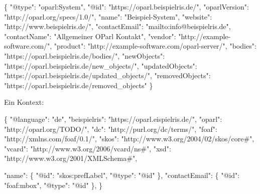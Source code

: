 \documentclass[,a4paper]{article}
\newenvironment{Shaded}{}{}
\newcommand{\DataTypeTok}[1]{\textcolor[rgb]{0.56,0.13,0.00}{{#1}}}
\newcommand{\StringTok}[1]{\textcolor[rgb]{0.25,0.44,0.63}{{#1}}}
\newcommand{\NormalTok}[1]{{#1}}
\begin{document}
\begin{Shaded}
\begin{Highlighting}[]
\NormalTok{\{}
    \DataTypeTok{"@type"}\NormalTok{: }\StringTok{"oparl:System"}\NormalTok{,}
    \DataTypeTok{"@id"}\NormalTok{: }\StringTok{"https://oparl.beispielris.de/"}\NormalTok{,}
    \DataTypeTok{"oparlVersion"}\NormalTok{: }\StringTok{"http://oparl.org/specs/1.0/"}\NormalTok{,}
    \DataTypeTok{"name"}\NormalTok{: }\StringTok{"Beispiel-System"}\NormalTok{,}
    \DataTypeTok{"website"}\NormalTok{: }\StringTok{"http://www.beispielris.de/"}\NormalTok{,}
    \DataTypeTok{"contactEmail"}\NormalTok{: }\StringTok{"mailto:info@beispielris.de"}\NormalTok{,}
    \DataTypeTok{"contactName"}\NormalTok{: }\StringTok{"Allgemeiner OParl Kontakt"}\NormalTok{,}
    \DataTypeTok{"vendor"}\NormalTok{: }\StringTok{"http://example-software.com/"}\NormalTok{,}
    \DataTypeTok{"product"}\NormalTok{: }\StringTok{"http://example-software.com/oparl-server/"}\NormalTok{,}
    \DataTypeTok{"bodies"}\NormalTok{: }\StringTok{"https://oparl.beispielris.de/bodies/"}\NormalTok{,}
    \DataTypeTok{"newObjects"}\NormalTok{: }\StringTok{"https://oparl.beispielris.de/new_objects/"}\NormalTok{,}
    \DataTypeTok{"updatedObjects"}\NormalTok{: }\StringTok{"https://oparl.beispielris.de/updated_objects/"}\NormalTok{,}
    \DataTypeTok{"removedObjects"}\NormalTok{: }\StringTok{"https://oparl.beispielris.de/removed_objects"}
\NormalTok{\}}
\end{Highlighting}
\end{Shaded}

Ein Kontext:

\begin{Shaded}
\begin{Highlighting}[]
\NormalTok{\{}
    \DataTypeTok{"@language"}\NormalTok{: }\StringTok{"de"}\NormalTok{,}
    \DataTypeTok{"beispielris"}\NormalTok{: }\StringTok{"https://oparl.eispielris.de/"}\NormalTok{,}
    \DataTypeTok{"oparl"}\NormalTok{: }\StringTok{"http://oparl.org/TODO/"}\NormalTok{,}
    \DataTypeTok{"dc"}\NormalTok{: }\StringTok{"http://purl.org/dc/terms/"}\NormalTok{,}
    \DataTypeTok{"foaf"}\NormalTok{: }\StringTok{"http://xmlns.com/foaf/0.1/"}\NormalTok{,}
    \DataTypeTok{"skos"}\NormalTok{: }\StringTok{"http://www.w3.org/2004/02/skos/core#"}\NormalTok{,}
    \DataTypeTok{"vcard"}\NormalTok{: }\StringTok{"http://www.w3.org/2006/vcard/ns#"}\NormalTok{,}
    \DataTypeTok{"xsd"}\NormalTok{: }\StringTok{"http://www.w3.org/2001/XMLSchema#"}\NormalTok{,}

    \DataTypeTok{"name"}\NormalTok{: \{}
        \DataTypeTok{"@id"}\NormalTok{: }\StringTok{"skos:prefLabel"}\NormalTok{,}
        \DataTypeTok{"@type"}\NormalTok{: }\StringTok{"@id"}
    \NormalTok{\},}
    \DataTypeTok{"contactEmail"}\NormalTok{: \{}
        \DataTypeTok{"@id"}\NormalTok{: }\StringTok{"foaf:mbox"}\NormalTok{,}
        \DataTypeTok{"@type"}\NormalTok{: }\StringTok{"@id"}
    \NormalTok{\},}
\NormalTok{\}}
\end{Highlighting}
\end{Shaded}
\end{document}
